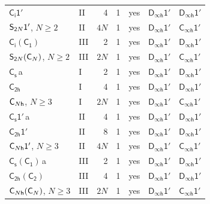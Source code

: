 \documentclass[10pt,a4paper]{article}
\makeatletter
\def\grouprule#1#2{\noalign{\marks\LTgroupmarks{\the\belowrulesep}\nobreak\vskip#1%
  \vskip\aboverulesep}\multispan\LT@cols\unskip{\leaders\hrule\@height#2\hfill\kern\z@}\cr
  \noalign{\penalty\LTrulebreak\vskip\belowrulesep\global\@lastruleclass\z@}}
\numberwithin{equation}{section}
\newcommand{\grp}[1]{\mathsf{#1}}
\newcommand{\clsletter}[1]{\,{\scriptsize\color{black!55}#1}}
\makeatother
\begin{document}
{\begin{longtable}{@{}llrrlll@{}}
\href{S2-1p.pdf}{$\grp{C_{i}1'}$} & II & 4 & 1 & yes & \href{Dinfh-1p.pdf}{$\grp{D_{\infty h}1'}$} & \href{Dinfh-1p.pdf}{$\grp{D_{\infty h}1'}$}\\
$\grp{S_{2\mathnormal{N}}1'}$, $N \ge 2$ & II & $4N$ & 1 & yes & \href{Dinfh-1p.pdf}{$\grp{D_{\infty h}1'}$} & \href{Cinfh-1p.pdf}{$\grp{C_{\infty h}1'}$}\\
\href{S2-C1.pdf}{$\grp{C_{i}}(\grp{C_{1}})$} & III & 2 & 1 & yes & \href{Dinfh-1p.pdf}{$\grp{D_{\infty h}1'}$} & \href{Dinfh-1p.pdf}{$\grp{D_{\infty h}1'}$}\\
$\grp{S_{2\mathnormal{N}}}(\grp{C_{\mathnormal{N}}})$, $N \ge 2$ & III & $2N$ & 1 & yes & \href{Dinfh-1p.pdf}{$\grp{D_{\infty h}1'}$} & \href{Cinfh-1p.pdf}{$\grp{C_{\infty h}1'}$}\\
\grouprule{0pt}{\lightrulewidth}
\href{../../../rotation/data/pdf/C1h.pdf}{$\grp{C_{s}}$}\clsletter{a} & I & 2 & 1 & yes & \href{Dinfh-1p.pdf}{$\grp{D_{\infty h}1'}$} & \href{Dinfh-1p.pdf}{$\grp{D_{\infty h}1'}$}\\
\href{../../../rotation/data/pdf/C2h.pdf}{$\grp{C_{2h}}$} & I & 4 & 1 & yes & \href{Dinfh-1p.pdf}{$\grp{D_{\infty h}1'}$} & \href{Dinfh-1p.pdf}{$\grp{D_{\infty h}1'}$}\\
$\grp{C_{\mathnormal{N}h}}$, $N \ge 3$ & I & $2N$ & 1 & yes & \href{Dinfh-1p.pdf}{$\grp{D_{\infty h}1'}$} & \href{Cinfh-1p.pdf}{$\grp{C_{\infty h}1'}$}\\
\href{C1h-1p.pdf}{$\grp{C_{s}1'}$}\clsletter{a} & II & 4 & 1 & yes & \href{Dinfh-1p.pdf}{$\grp{D_{\infty h}1'}$} & \href{Dinfh-1p.pdf}{$\grp{D_{\infty h}1'}$}\\
\href{C2h-1p.pdf}{$\grp{C_{2h}1'}$} & II & 8 & 1 & yes & \href{Dinfh-1p.pdf}{$\grp{D_{\infty h}1'}$} & \href{Dinfh-1p.pdf}{$\grp{D_{\infty h}1'}$}\\
$\grp{C_{\mathnormal{N}h}1'}$, $N \ge 3$ & II & $4N$ & 1 & yes & \href{Dinfh-1p.pdf}{$\grp{D_{\infty h}1'}$} & \href{Cinfh-1p.pdf}{$\grp{C_{\infty h}1'}$}\\
\href{C1h-C1.pdf}{$\grp{C_{s}}(\grp{C_{1}})$}\clsletter{a} & III & 2 & 1 & yes & \href{Dinfh-1p.pdf}{$\grp{D_{\infty h}1'}$} & \href{Dinfh-1p.pdf}{$\grp{D_{\infty h}1'}$}\\
\href{C2h-C2.pdf}{$\grp{C_{2h}}(\grp{C_{2}})$} & III & 4 & 1 & yes & \href{Dinfh-1p.pdf}{$\grp{D_{\infty h}1'}$} & \href{Dinfh-1p.pdf}{$\grp{D_{\infty h}1'}$}\\
$\grp{C_{\mathnormal{N}h}}(\grp{C_{\mathnormal{N}}})$, $N \ge 3$ & III & $2N$ & 1 & yes & \href{Dinfh-1p.pdf}{$\grp{D_{\infty h}1'}$} & \href{Cinfh-1p.pdf}{$\grp{C_{\infty h}1'}$}\\

\end{longtable}}
\end{document}
